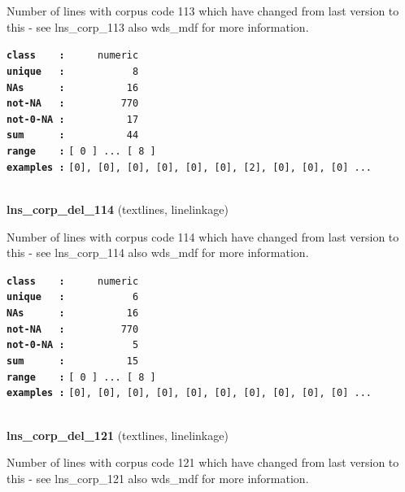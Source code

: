 \documentclass[]{article}
\begin{document}
Number of lines with corpus code 113 which have changed from last
version to this - see lns\_corp\_113 also wds\_mdf for more information.

\textbf{\texttt{class\ \ \ \ :}} \texttt{~~~~~numeric}\\
\textbf{\texttt{unique\ \ \ :}} \texttt{~~~~~~~~~~~8}\\
\textbf{\texttt{NAs\ \ \ \ \ \ :}} \texttt{~~~~~~~~~~16}\\
\textbf{\texttt{not-NA\ \ \ :}} \texttt{~~~~~~~~~770}\\
\textbf{\texttt{not-0-NA\ :}} \texttt{~~~~~~~~~~17}\\
\textbf{\texttt{sum\ \ \ \ \ \ :}} \texttt{~~~~~~~~~~44}\\
\textbf{\texttt{range\ \ \ \ :}}
\texttt{{[}\ 0\ {]}\ ...\ {[}\ 8\ {]}}\\
\textbf{\texttt{examples\ :}}
\texttt{{[}0{]},\ {[}0{]},\ {[}0{]},\ {[}0{]},\ {[}0{]},\ {[}0{]},\ {[}2{]},\ {[}0{]},\ {[}0{]},\ {[}0{]}\ ...}\\

~

\textbf{lns\_corp\_del\_114} (textlines, linelinkage)

Number of lines with corpus code 114 which have changed from last
version to this - see lns\_corp\_114 also wds\_mdf for more information.

\textbf{\texttt{class\ \ \ \ :}} \texttt{~~~~~numeric}\\
\textbf{\texttt{unique\ \ \ :}} \texttt{~~~~~~~~~~~6}\\
\textbf{\texttt{NAs\ \ \ \ \ \ :}} \texttt{~~~~~~~~~~16}\\
\textbf{\texttt{not-NA\ \ \ :}} \texttt{~~~~~~~~~770}\\
\textbf{\texttt{not-0-NA\ :}} \texttt{~~~~~~~~~~~5}\\
\textbf{\texttt{sum\ \ \ \ \ \ :}} \texttt{~~~~~~~~~~15}\\
\textbf{\texttt{range\ \ \ \ :}}
\texttt{{[}\ 0\ {]}\ ...\ {[}\ 8\ {]}}\\
\textbf{\texttt{examples\ :}}
\texttt{{[}0{]},\ {[}0{]},\ {[}0{]},\ {[}0{]},\ {[}0{]},\ {[}0{]},\ {[}0{]},\ {[}0{]},\ {[}0{]},\ {[}0{]}\ ...}\\

~

\textbf{lns\_corp\_del\_121} (textlines, linelinkage)

Number of lines with corpus code 121 which have changed from last
version to this - see lns\_corp\_121 also wds\_mdf for more information.
\end{document}
